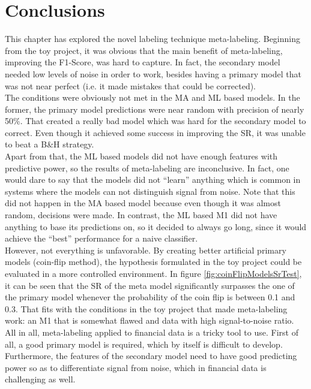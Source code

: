 \documentclass[a4paper]{report}
\begin{document}
\vspace{100cm}


\section{Conclusions}
This chapter has explored the novel labeling technique meta-labeling. 
Beginning from the toy project, it was obvious that the main benefit of 
meta-labeling, improving the F1-Score, was hard to capture. In fact, the 
secondary model needed low levels of noise in order to work, besides having a 
primary model that was not near perfect (i.e. it made mistakes that could be 
corrected).\\

The conditions were obviously not met in the MA and ML based models. In the 
former, the primary model predictions were near random with precision of 
nearly 50\%. That created a really bad model which was hard for the secondary 
model to correct. Even though it achieved some success in improving the SR, 
it was unable to beat a B\&H strategy.\\

Apart from that, the ML based models did not have enough features with 
predictive power, so the results of meta-labeling are inconclusive. In fact, 
one would dare to say that the models did not ``learn'' anything which is 
common in systems where the models can not distinguish signal from noise. 
Note that this did not happen in the MA based model because even though it 
was almost random, decisions were made. In contrast, the ML based M1 did not 
have anything to base its predictions on, so it decided to always go long, 
since it would achieve the ``best'' performance for a naive classifier.\\

However, not everything is unfavorable. By creating better artificial primary 
models (coin-flip method), the hypothesis formulated in the toy project could 
be evaluated in a more controlled environment. In figure 
\ref{fig:coinFlipModelsSrTest}, it can be seen that the SR of the meta model 
significantly surpasses the one of the primary model whenever the probability 
of the coin flip is between 0.1 and 0.3. That fits with the conditions in the 
toy project that made meta-labeling work: an M1 that is somewhat flawed and 
data with high signal-to-noise ratio.\\

All in all, meta-labeling applied to financial data is a tricky tool to use. 
First of all, a good primary model is required, which by itself is difficult 
to develop. Furthermore, the features of the secondary model need to have 
good predicting power so as to differentiate signal from noise, which in 
financial data is challenging as well.
\end{document}
